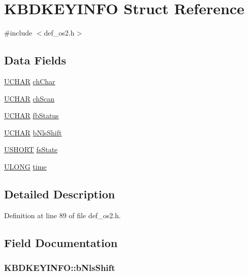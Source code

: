 \hypertarget{structKBDKEYINFO}{\section{K\+B\+D\+K\+E\+Y\+I\+N\+F\+O Struct Reference}
\label{structKBDKEYINFO}
}


{\ttfamily \#include $<$def\+\_\+os2.\+h$>$}

\subsection*{Data Fields}
\begin{DoxyCompactItemize}
\item 
\hyperlink{def__os2_8h_a4f4bb67531a9bf6f0b9c6ad76aeba587}{U\+C\+H\+A\+R} \hyperlink{structKBDKEYINFO_ab9b26ff52bb8ad4db5ccf23c0df6dde1}{ch\+Char}
\item 
\hyperlink{def__os2_8h_a4f4bb67531a9bf6f0b9c6ad76aeba587}{U\+C\+H\+A\+R} \hyperlink{structKBDKEYINFO_ac8f0a01f29b368186feaff121aad3949}{ch\+Scan}
\item 
\hyperlink{def__os2_8h_a4f4bb67531a9bf6f0b9c6ad76aeba587}{U\+C\+H\+A\+R} \hyperlink{structKBDKEYINFO_a25118adaeabcb88ec219d7fd28be8e6b}{fb\+Status}
\item 
\hyperlink{def__os2_8h_a4f4bb67531a9bf6f0b9c6ad76aeba587}{U\+C\+H\+A\+R} \hyperlink{structKBDKEYINFO_a6f8c24c5ec818a5a9f7ae391cac80774}{b\+Nls\+Shift}
\item 
\hyperlink{def__os2_8h_a5850d5316caf7f4cedd742fdf8cd7c02}{U\+S\+H\+O\+R\+T} \hyperlink{structKBDKEYINFO_a3488538481ea4ed36912b80b0ff66f7d}{fs\+State}
\item 
\hyperlink{def__os2_8h_af632da489ebc3708ec3ab6791ee53fa4}{U\+L\+O\+N\+G} \hyperlink{structKBDKEYINFO_a9dd7edd2c1844356fa23edd0ca4fcc28}{time}
\end{DoxyCompactItemize}


\subsection{Detailed Description}


Definition at line 89 of file def\+\_\+os2.\+h.



\subsection{Field Documentation}
\hypertarget{structKBDKEYINFO_a6f8c24c5ec818a5a9f7ae391cac80774}{
\subsubsection[{b\+Nls\+Shift}]{ K\+B\+D\+K\+E\+Y\+I\+N\+F\+O\+::b\+Nls\+Shift}}\label{structKBDKEYINFO_a6f8c24c5ec818a5a9f7ae391cac80774}


